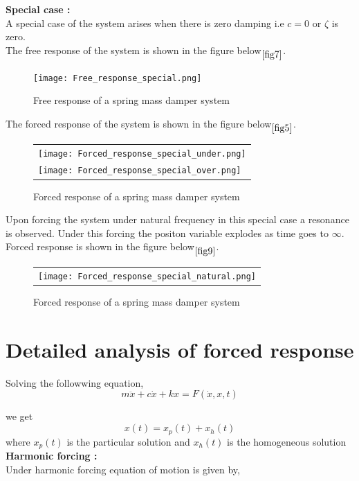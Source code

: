 \documentclass[11pt]{article}
\begin{document}
\newpage
\noindent\textbf{Special case :} \\
A special case of the system arises when there is zero damping i.e $c = 0$ or $\zeta$ is zero. \\
The free response of the system is shown in the figure below$\phantom{}_{\ref{fig7}}$.

\begin{figure}[H]
	\centering
	\centering
	\texttt{[image: Free\_response\_special.png]}
	\caption{Free response of a spring mass damper system}
\end{figure}
\label{fig7}

\newpage
The forced response of the system is shown in the figure below$\phantom{}_{\ref{fig5}}$.

\begin{figure}[H]
	\centering
	\begin{tabular} {l}
	\texttt{[image: Forced\_response\_special\_under.png]} \\
	\texttt{[image: Forced\_response\_special\_over.png]} 
	\end{tabular}
	\caption{Forced response of a spring mass damper system}
\end{figure}
\label{fig8}

\newpage
\noindent Upon forcing the system under natural frequency in this special case a resonance is observed. Under this
forcing the positon variable explodes as time goes to $\infty$.\\
Forced response is shown in the figure below$\phantom{}_{\ref{fig9}}$.


\begin{figure}[H]
	\centering
	\begin{tabular} {l}
	\texttt{[image: Forced\_response\_special\_natural.png]} 
	\end{tabular}
	\caption{Forced response of a spring mass damper system}
\end{figure}
\label{fig9} 




\section{Detailed analysis of forced response}

Solving the followwing equation,
$$ m\ddot{x} + c\dot{x} + kx = F(\dot{x},x,t) $$

we get 
$$ x(t) = x_p(t) + x_h(t)$$
where $x_p(t)$ is the particular solution and $x_h(t)$ is the homogeneous solution\\
\hfill \break
\noindent\textbf{Harmonic forcing :} \\
\noindent Under harmonic forcing equation of motion is given by,
\end{document}
